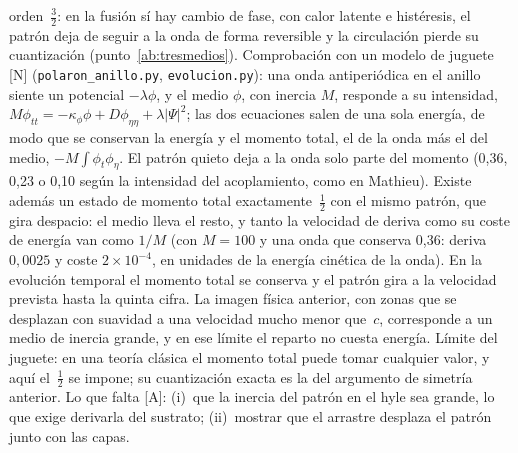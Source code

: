 \documentclass[11pt,a4paper]{article}
\newcommand{\st}[1]{\textup{[#1]}}
\newcommand{\prog}[1]{\texttt{#1}}
\begin{document}
\begin{enumerate}[label=\arabic*.,ref=\arabic*,leftmargin=*]
orden~$\tfrac32$: en la fusión sí hay cambio de fase, con calor latente e histéresis, el patrón deja de seguir a la onda de forma reversible y la circulación pierde su cuantización (punto~\ref{ab:tresmedios}). Comprobación con un modelo de juguete \st{N} (\prog{polaron\_anillo.py}, \prog{evolucion.py}): una onda antiperiódica en el anillo siente un potencial $-\lambda\phi$, y el medio $\phi$, con inercia $M$, responde a su intensidad, $M\phi_{tt}=-\kappa_\phi\phi+D\phi_{\eta\eta}+\lambda|\Psi|^2$; las dos ecuaciones salen de una sola energía, de modo que se conservan la energía y el momento total, el de la onda más el del medio, $-M\!\int\!\phi_t\phi_\eta$. El patrón quieto deja a la onda solo parte del momento (0,36, 0,23 o 0,10 según la intensidad del acoplamiento, como en Mathieu). Existe además un estado de momento total exactamente~$\tfrac12$ con el mismo patrón, que gira despacio: el medio lleva el resto, y tanto la velocidad de deriva como su coste de energía van como $1/M$ (con $M=100$ y una onda que conserva 0,36: deriva $0,0025$ y coste $2\times10^{-4}$, en unidades de la energía cinética de la onda). En la evolución temporal el momento total se conserva y el patrón gira a la velocidad prevista hasta la quinta cifra. La imagen física anterior, con zonas que se desplazan con suavidad a una velocidad mucho menor que~$c$, corresponde a un medio de inercia grande, y en ese límite el reparto no cuesta energía. Límite del juguete: en una teoría clásica el momento total puede tomar cualquier valor, y aquí el~$\tfrac12$ se impone; su cuantización exacta es la del argumento de simetría anterior. Lo que falta \st{A}: (i)~que la inercia del patrón en el hyle sea grande, lo que exige derivarla del sustrato; (ii)~mostrar que el arrastre desplaza el patrón junto con las capas.

\end{enumerate}
\end{document}
